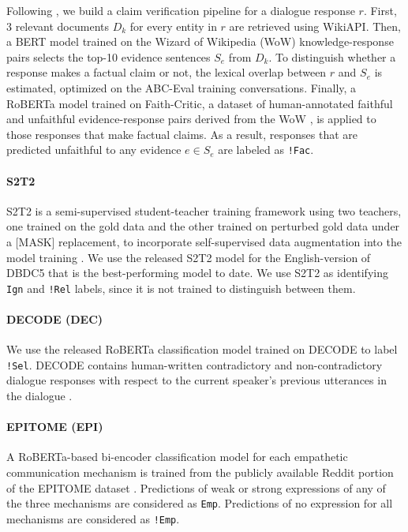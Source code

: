 Following \citet{gupta:22}, we build a claim verification pipeline for a dialogue response $r$. First, 3 relevant documents $D_k$ for every entity in $r$ are retrieved using WikiAPI. Then, a BERT model trained on the Wizard of Wikipedia (WoW) knowledge-response pairs \cite{dinan:19} selects the top-10 evidence sentences $S_e$ from $D_k$. To distinguish whether a response makes a factual claim or not, the lexical overlap between $r$ and $S_e$ is estimated, optimized on the ABC-Eval training conversations. Finally, a RoBERTa model trained on Faith-Critic, a dataset of human-annotated faithful and unfaithful evidence-response pairs derived from the WoW \cite{dziri_faithdial:22}, is applied to those responses that make factual claims. As a result, responses that are predicted unfaithful to any evidence $e \in S_e$ are labeled as \texttt{!Fac}.

\paragraph{S2T2}  

S2T2 is a semi-supervised student-teacher training framework using two teachers, one trained on the gold data and the other trained on perturbed gold data under a [MASK] replacement, to incorporate self-supervised data augmentation into the model training \cite{lin:22}. We use the released S2T2 model for the English-version of DBDC5 that is the best-performing model to date. We use S2T2 as identifying \texttt{Ign} and \texttt{!Rel} labels, since it is not trained to distinguish between them.

\paragraph{DECODE (DEC)} 

We use the released RoBERTa classification model trained on DECODE to label \texttt{!Sel}. DECODE contains human-written contradictory and non-contradictory dialogue responses with respect to the current speaker's previous utterances in the dialogue \cite{nie:21}.

\paragraph{EPITOME (EPI)} 

A RoBERTa-based bi-encoder classification model for each empathetic communication mechanism is trained from the publicly available Reddit portion of the EPITOME dataset \cite{sharma:20}. Predictions of weak or strong expressions of any of the three mechanisms are considered as \texttt{Emp}. Predictions of no expression for all mechanisms are considered as \texttt{!Emp}.

